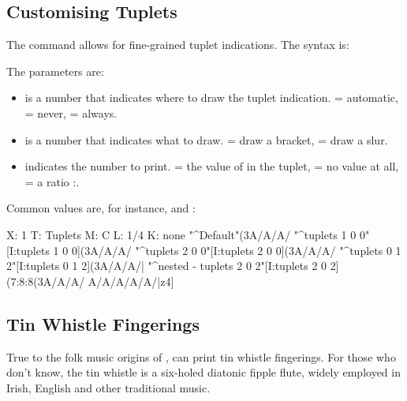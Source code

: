 \documentclass[a4paper,fullpage,12pt]{book}
\begin{document}

\subsection{Customising Tuplets}
\label{sec:tuplets}

The  command allows for fine-grained tuplet
indications. The syntax is:

\medskip

   

\medskip

The parameters are:

\begin{itemize}
  
  \item {} is a number that indicates where to draw the tuplet
  indication.  = automatic,  = never,  = always.
  
  \item {} is a number that indicates what to draw.  = 
  draw a bracket,  = draw a slur.
  
  \item {} indicates the number to print.  = the value of
   in the tuplet,  = no value at all,  = a ratio 
  :.
  
\end{itemize}

Common values are, for instance,  and
:

\begin{abcsource}
X: 1
T: Tuplets
M: C
L: 1/4
K: none
%
"^Default"(3A/A/A/ "^tuplets 1 0 0"[I:tuplets 1 0 0](3A/A/A/ \bl
"^tuplets 2 0 0"[I:tuplets 2 0 0](3A/A/A/ \bl
"^tuplets 0 1 2"[I:tuplets 0 1 2](3A/A/A/|\bl
"^nested - tuplets 2 0 2"[I:tuplets 2 0 2](7:8:8(3A/A/A/ A/A/A/A/A/|z4]
\end{abcsource}



\subsection{Tin Whistle Fingerings}

True to the folk music origins of \ABC, \abcm{} can print tin
whistle fingerings. For those who don't know, the tin whistle is a
six-holed diatonic fipple flute, widely employed in Irish, English and
other traditional music.
\end{document}
